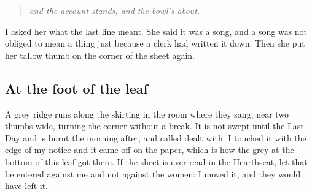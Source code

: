 \documentclass{design/chronicle}
\begin{document}
\begin{quote}\itshape and the account stands, and the bowl’s about.\end{quote}

I asked her what the last line meant. She said it was a song, and a song was not obliged to mean a thing just because a clerk had written it down. Then she put her tallow thumb on the corner of the sheet again.

\subsection*{At the foot of the leaf}

A grey ridge runs along the skirting in the room where they sang, near two thumbs wide, turning the corner without a break. It is not swept until the Last Day and is burnt the morning after, and called dealt with. I touched it with the edge of my notice and it came off on the paper, which is how the grey at the bottom of this leaf got there. If the sheet is ever read in the Hearthseat, let that be entered against me and not against the women: I moved it, and they would have left it.
\end{document}
